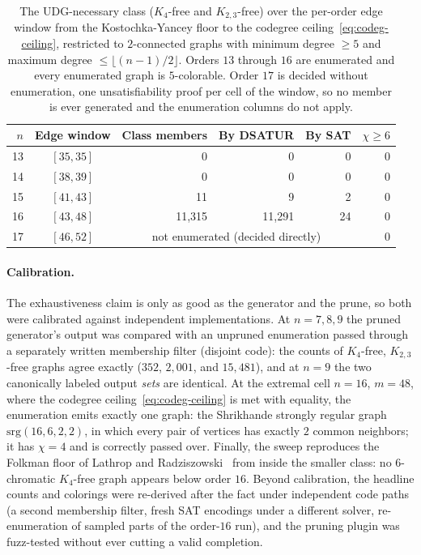 \documentclass[11pt]{article}
\theoremstyle{definition}
\newcommand{\chrom}{\chi}
\begin{document}
\begin{table}[ht]
\centering
\caption{The UDG-necessary class ($K_4$-free and $K_{2,3}$-free) over the
per-order edge window from the Kostochka-Yancey floor to the codegree
ceiling~\eqref{eq:codeg-ceiling}, restricted to $2$-connected graphs with minimum
degree $\ge 5$ and maximum degree $\le \lfloor (n-1)/2 \rfloor$. Orders $13$
through $16$ are enumerated and every enumerated graph is $5$-colorable. Order
$17$ is decided without enumeration, one unsatisfiability proof per cell of the
window, so no member is ever generated and the enumeration columns do not apply.}
\label{tab:e17}
\begin{tabular}{r c r r r r}
\toprule
$n$ & Edge window & Class members & By DSATUR & By SAT & $\chrom \ge 6$ \\
\midrule
13 & $[35, 35]$ & 0 & 0 & 0 & 0 \\
14 & $[38, 39]$ & 0 & 0 & 0 & 0 \\
15 & $[41, 43]$ & 11 & 9 & 2 & 0 \\
16 & $[43, 48]$ & 11{,}315 & 11{,}291 & 24 & 0 \\
17 & $[46, 52]$ & \multicolumn{3}{c}{not enumerated (decided directly)} & 0 \\
\bottomrule
\end{tabular}
\end{table}

\paragraph{Calibration.} The exhaustiveness claim is only as good as the
generator and the prune, so both were calibrated against independent
implementations. At $n = 7, 8, 9$ the pruned generator's output was compared
with an unpruned enumeration passed through a separately written membership
filter (disjoint code): the counts of $K_4$-free, $K_{2,3}$-free graphs agree
exactly ($352$, $2{,}001$, and $15{,}481$), and at $n = 9$ the two canonically
labeled output \emph{sets} are identical. At the extremal cell $n = 16$,
$m = 48$, where the codegree ceiling~\eqref{eq:codeg-ceiling} is met with
equality, the enumeration emits exactly one graph: the Shrikhande strongly
regular graph $\mathrm{srg}(16,6,2,2)$, in which every pair of vertices has
exactly $2$ common neighbors; it has $\chrom = 4$ and is correctly passed
over. Finally, the sweep reproduces the Folkman floor of Lathrop and
Radziszowski~\cite{LathropRadziszowski2011} from inside the smaller class: no
$6$-chromatic $K_4$-free graph appears below order $16$. Beyond calibration,
the headline counts and colorings were re-derived after the fact under
independent code paths (a second membership filter, fresh SAT encodings under
a different solver, re-enumeration of sampled parts of the order-$16$ run),
and the pruning plugin was fuzz-tested without ever cutting a valid
completion.
\end{document}
